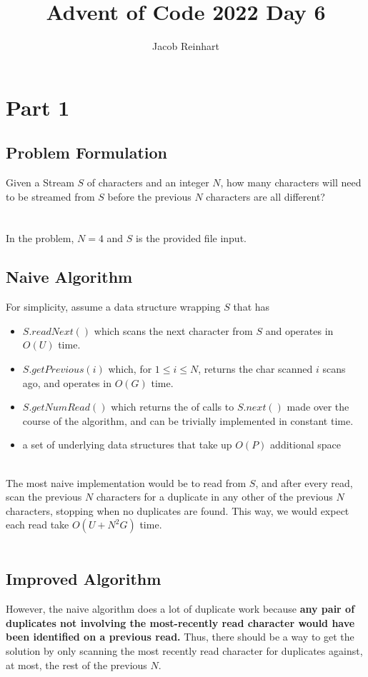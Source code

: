 \documentclass[12pt]{article}
\title{Advent of Code 2022 Day 6}
\author{Jacob Reinhart}
\begin{document}
\maketitle

\section{Part 1}
\subsection{Problem Formulation}
Given a Stream $S$ of characters and an integer $N$, how many characters will need to be streamed from $S$ before the previous $N$ characters are all different? \\

\\
\ \\
\noindent In the problem, $N=4$ and $S$ is the provided file input.\\
\subsection{Naive Algorithm}
\noindent For simplicity, assume a data structure wrapping $S$ that has 
\begin{itemize}
    \item $S.readNext()$ which scans the next character from $S$ and operates in $O(U)$ time.
    \item $S.getPrevious(i)$ which, for $1 \leq i \leq N$, returns the char scanned $i$ scans ago, and operates in $O(G)$ time.
    \item $S.getNumRead()$ which returns the of calls to $S.next()$ made over the course of the algorithm, and can be trivially implemented in constant time.
    \item a set of underlying data structures that take up $O(P)$ additional space
\end{itemize}
\medskip\\
The most naive implementation would be to read from $S$, and after every read, scan the previous $N$ characters for a duplicate in any other of the previous $N$ characters, stopping when no duplicates are found. This way, we would expect each read take $O(U + N^2G)$ time. \\
\\
\pagebreak
\subsection{Improved Algorithm}
However, the naive algorithm does a lot of duplicate work because \textbf{any pair of duplicates not involving the most-recently read character  would have been identified on a previous read.}
Thus, there should be a way to get the solution by only scanning the most recently read character for duplicates against, at most, the rest of the previous $N$.\\
\end{document}
